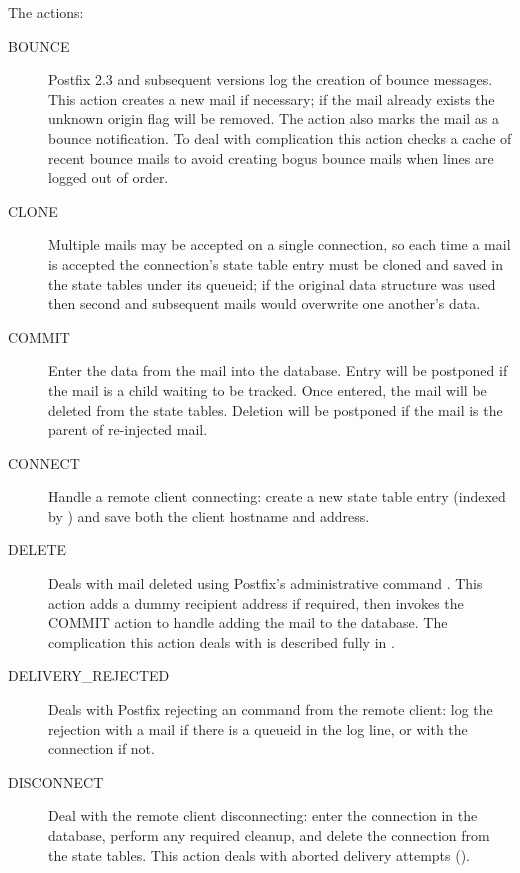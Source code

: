 The actions:

\begin{description}

    \item [BOUNCE] Postfix 2.3 and subsequent versions log the creation of
        bounce messages.  This action creates a new mail if necessary; if
        the mail already exists the unknown origin flag will be removed.
        The action also marks the mail as a bounce notification.  To deal
        with complication  this
        action checks a cache of recent bounce mails to avoid creating
        bogus bounce mails when lines are logged out of order.

    \item [CLONE] Multiple mails may be accepted on a single connection, so
        each time a mail is accepted the connection's state table entry
        must be cloned and saved in the state tables under its queueid; if
        the original data structure was used then second and subsequent
        mails would overwrite one another's data.

    \item [COMMIT] Enter the data from the mail into the database. Entry
        will be postponed if the mail is a child waiting to be tracked.
        Once entered, the mail will be deleted from the state tables.
        Deletion will be postponed if the mail is the parent of re-injected
        mail.

    \item [CONNECT] Handle a remote client connecting: create a new state
        table entry (indexed by  \pid{}) and save both the
        client hostname and \IP{} address.

    \item [DELETE] Deals with mail deleted using Postfix's administrative
        command .  This action adds a dummy recipient
        address if required, then invokes the COMMIT action to handle
        adding the mail to the database.  The complication this action
        deals with is described fully in .  

    \item [DELIVERY\_REJECTED] Deals with Postfix rejecting an \SMTP{}
        command from the remote client: log the rejection with a mail if
        there is a queueid in the log line, or with the connection if not.

    \item [DISCONNECT] Deal with the remote client disconnecting: enter the
        connection in the database, perform any required cleanup, and
        delete the connection from the state tables.  This action deals
        with aborted delivery attempts
        ().


\end{description}
